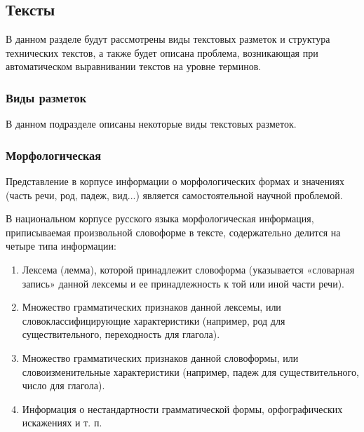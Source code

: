 \subsection{Тексты}

В данном разделе будут рассмотрены виды текстовых разметок и структура технических текстов, а также будет описана проблема, возникающая при автоматическом выравнивании текстов на уровне терминов.

\subsubsection{Виды разметок}

В данном подразделе описаны некоторые виды текстовых разметок.

\subsubsection*{Морфологическая}

Представление в корпусе информации о морфологических формах и значениях (часть речи, род, падеж, вид...) является самостоятельной научной проблемой. \cite{ruscorpora}

В национальном корпусе русского языка \cite{ruscorpora} морфологическая информация, приписываемая произвольной словоформе в тексте, содержательно делится на четыре типа информации:
\begin{enumerate}
    \item Лексема (лемма), которой принадлежит словоформа (указывается «словарная запись» данной лексемы и ее принадлежность к той или иной части речи).
    \item Множество грамматических признаков данной лексемы, или словоклассифицирующие характеристики (например, род для существительного, переходность для глагола).
    \item Множество грамматических признаков данной словоформы, или словоизменительные характеристики (например, падеж для существительного, число для глагола).
    \item Информация о нестандартности грамматической формы, орфографических искажениях и т. п.
\end{enumerate}

